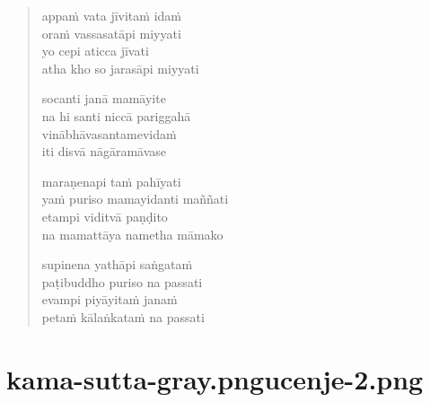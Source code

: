 

\cleartoverso

\vspace*{30mm}

\begin{verse}

appaṁ vata jīvitaṁ idaṁ\\
oraṁ vassasatāpi miyyati\\
yo cepi aticca jīvati\\
atha kho so jarasāpi miyyati

socanti janā mamāyite\\
na hi santi niccā pariggahā\\
vinābhāvasantamevidaṁ\\
iti disvā nāgāramāvase

maraṇenapi taṁ pahīyati\\
yaṁ puriso mamayidanti maññati\\
etampi viditvā paṇḍito\\
na mamattāya nametha māmako

supinena yathāpi saṅgataṁ\\
paṭibuddho puriso na passati\\
evampi piyāyitaṁ janaṁ\\
petaṁ kālaṅkataṁ na passati

\end{verse}


\chapter[Jarā Sutta]{{kama-sutta-gray.png}{ucenje-2.png}}

